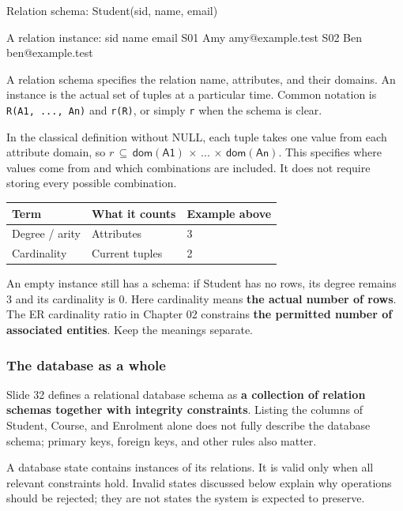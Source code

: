 \begin{StudyCode}
Relation schema: Student(sid, name, email)

A relation instance:
sid   name   email
S01   Amy    amy@example.test
S02   Ben    ben@example.test
\end{StudyCode}

A relation schema specifies the relation name, attributes, and their domains. An instance is the actual set of tuples at a particular time. Common notation is \texttt{R(\allowbreak{}A1,\allowbreak{}\ .\allowbreak{}.\allowbreak{}.\allowbreak{},\allowbreak{}\ An)\allowbreak{}} and \texttt{r(\allowbreak{}R)\allowbreak{}}, or simply \texttt{r} when the schema is clear.

In the classical definition without NULL, each tuple takes one value from each attribute domain, so \(r\,\subseteq \,\mathsf{dom}(\mathsf{A1})\,\times \,...\,\times \,\mathsf{dom}(\mathsf{An})\). This specifies where values come from and which combinations are included. It does not require storing every possible combination.

\begin{longtable}[]{@{}lll@{}}
\toprule\noalign{}
Term & What it counts & Example above \\
\midrule\noalign{}
\endhead
\bottomrule\noalign{}
\endlastfoot
Degree / arity & Attributes & 3 \\
Cardinality & Current tuples & 2 \\
\end{longtable}

An empty instance still has a schema: if Student has no rows, its degree remains 3 and its cardinality is 0. Here cardinality means \textbf{the actual number of rows}. The ER cardinality ratio in Chapter 02 constrains \textbf{the permitted number of associated entities}. Keep the meanings separate.

\subsubsection{The database as a whole}\label{03_relational_model_and_integrity_en-the-database-as-a-whole}

Slide 32 defines a relational database schema as \textbf{a collection of relation schemas together with integrity constraints}. Listing the columns of Student, Course, and Enrolment alone does not fully describe the database schema; primary keys, foreign keys, and other rules also matter.

A database state contains instances of its relations. It is valid only when all relevant constraints hold. Invalid states discussed below explain why operations should be rejected; they are not states the system is expected to preserve.

